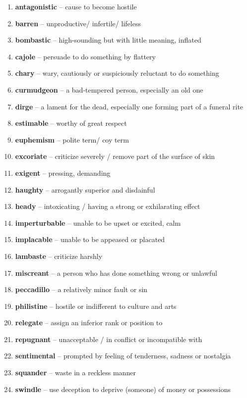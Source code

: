 \begin{enumerate}[wide,labelindent=0pt]
\item \textbf{antagonistic} -- cause to become hostile
\item \textbf{barren} -- unproductive/ infertile/ lifeless
\item \textbf{bombastic} -- high-sounding but with little meaning, inflated
\item \textbf{cajole} -- persuade to do something by flattery
\item \textbf{chary} -- wary, cautiously or suspiciously reluctant to do something
\item \textbf{curmudgeon} -- a bad-tempered person, especially an old one
\item \textbf{dirge} -- a lament for the dead, especially one forming part of a funeral rite
\item \textbf{estimable} -- worthy of great respect
\item \textbf{euphemism} -- polite term/ coy term
\item \textbf{excoriate} -- criticize severely / remove part of the surface of skin
\item \textbf{exigent} -- pressing, demanding
\item \textbf{haughty} -- arrogantly superior and disdainful
\item \textbf{heady} -- intoxicating / having a strong or exhilarating effect
\item \textbf{imperturbable} -- unable to be upset or excited, calm
\item \textbf{implacable} -- unable to be appeased or placated
\item \textbf{lambaste} -- criticize harshly
\item \textbf{miscreant} -- a person who has done something wrong or unlawful
\item \textbf{peccadillo} -- a relatively minor fault or sin
\item \textbf{philistine} -- hostile or indifferent to culture and arts
\item \textbf{relegate} -- assign an inferior rank or position to
\item \textbf{repugnant} -- unacceptable / in conflict or incompatible with
\item \textbf{sentimental} -- prompted by feeling of tenderness, sadness or nostalgia
\item \textbf{squander} -- waste in a reckless manner
\item \textbf{swindle} -- use deception to deprive (someone) of money or possessions

\end{enumerate}

